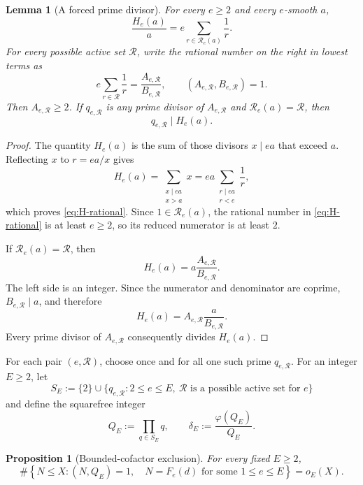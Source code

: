 \documentclass[11pt]{article}
\newtheorem{proposition}[theorem]{Proposition}
\newtheorem{lemma}[theorem]{Lemma}
\theoremstyle{definition}
\theoremstyle{remark}
\begin{document}
\begin{lemma}[A forced prime divisor]\label{lem:forced-prime}
For every $e\geq2$ and every $e$-smooth $a$,
\[
\frac{H_e(a)}a
=e\sum_{r\in\mathcal R_e(a)}\frac1r. \tag{5.2}\label{eq:H-rational}
\]
For every possible active set $\mathcal R$, write the rational number on the right in lowest terms as
\[
e\sum_{r\in\mathcal R}\frac1r=\frac{A_{e,\mathcal R}}{B_{e,\mathcal R}},
\qquad (A_{e,\mathcal R},B_{e,\mathcal R})=1.
\]
Then $A_{e,\mathcal R}\geq2$.  If $q_{e,\mathcal R}$ is any prime divisor of $A_{e,\mathcal R}$ and $\mathcal R_e(a)=\mathcal R$, then
\[
q_{e,\mathcal R}\mid H_e(a).
\]
\end{lemma}

\begin{proof}
The quantity $H_e(a)$ is the sum of those divisors $x\mid ea$ that exceed $a$.  Reflecting $x$ to $r=ea/x$ gives
\[
H_e(a)
=\sum_{\substack{x\mid ea\\x>a}}x
=ea\sum_{\substack{r\mid ea\\r<e}}\frac1r,
\]
which proves \eqref{eq:H-rational}.  Since $1\in\mathcal R_e(a)$, the rational number in \eqref{eq:H-rational} is at least $e\geq2$, so its reduced numerator is at least $2$.

If $\mathcal R_e(a)=\mathcal R$, then
\[
H_e(a)=a\frac{A_{e,\mathcal R}}{B_{e,\mathcal R}}.
\]
The left side is an integer.  Since the numerator and denominator are coprime, $B_{e,\mathcal R}\mid a$, and therefore
\[
H_e(a)=A_{e,\mathcal R}\frac{a}{B_{e,\mathcal R}}.
\]
Every prime divisor of $A_{e,\mathcal R}$ consequently divides $H_e(a)$.
\end{proof}

For each pair $(e,\mathcal R)$, choose once and for all one such prime $q_{e,\mathcal R}$.  For an integer $E\geq2$, let
\[
S_E:=\{2\}\cup
\{q_{e,\mathcal R}:2\leq e\leq E,\ \mathcal R
\text{ is a possible active set for }e\}
\]
and define the squarefree integer
\[
Q_E:=\prod_{q\in S_E}q,
\qquad
\delta_E:=\frac{\varphi(Q_E)}{Q_E}.
\]

\begin{proposition}[Bounded-cofactor exclusion]\label{prop:small-e}
For every fixed $E\geq2$,
\[
\#\left\{N\leq X:
(N,Q_E)=1,\quad
N=F_e(d)\text{ for some }1\leq e\leq E
\right\}=o_E(X).
\]
\end{proposition}
\end{document}
